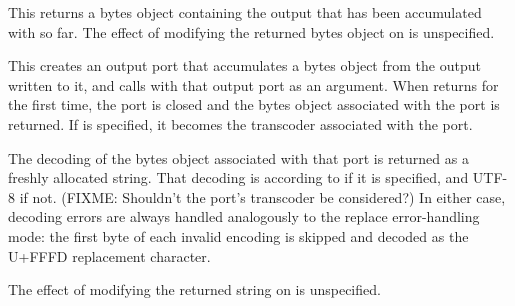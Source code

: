 \begin{entry}{%
}

This returns a bytes object containing the output that has been accumulated with
 so far.
The effect of modifying the returned bytes object on 
is unspecified.
\end{entry}

\begin{entry}{%
}

 This
creates an output port that accumulates a bytes object from the output
written to it, and calls  with that output port as an
argument. When  returns for the first time, the port is
closed and the bytes object associated with the port is returned.  If
 is specified, it becomes the transcoder associated
with the port.
\end{entry}

\begin{entry}{%
}

The decoding of the bytes object associated with that port is returned
as a freshly allocated string.  That decoding is according to
 if it is specified, and UTF-8 if not.
(FIXME: Shouldn't the port's transcoder be considered?)
In either
case, decoding errors are always handled analogously to the {\cf
  replace} error-handling mode: the first byte of each invalid
encoding is skipped and decoded as the U+FFFD replacement character.

The effect of modifying the returned string on 
is unspecified.
\end{entry}

